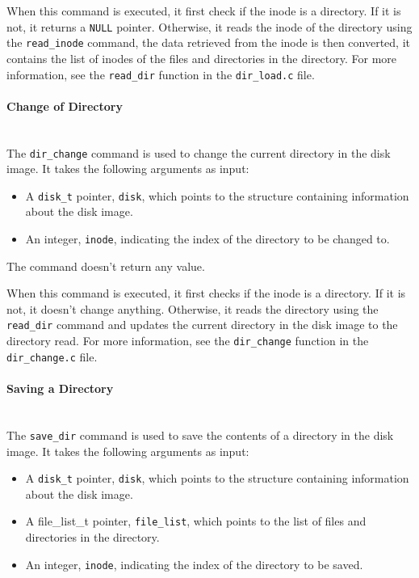 \documentclass{article}
\begin{document}
When this command is executed, it first check if the inode is a directory. If it is not, it returns a \texttt{NULL} pointer. Otherwise, it reads the inode of the directory using the \texttt{read\_inode} command, the data retrieved from the inode is then converted, it contains the list of inodes of the files and directories in the directory. For more information, see the \texttt{read\_dir} function in the \texttt{dir\_load.c} file.

\paragraph{Change of Directory}\mbox{}\\
The \texttt{dir\_change} command is used to change the current directory in the disk image. It takes the following arguments as input:

\begin{itemize}
    \item A \texttt{disk\_t} pointer, \texttt{disk}, which points to the structure containing information about the disk image.
    \item An integer, \texttt{inode}, indicating the index of the directory to be changed to.
\end{itemize}

The command doesn't return any value.

When this command is executed, it first checks if the inode is a directory. If it is not, it doesn't change anything. Otherwise, it reads the directory using the \texttt{read\_dir} command and updates the current directory in the disk image to the directory read. For more information, see the \texttt{dir\_change} function in the \texttt{dir\_change.c} file.

\paragraph{Saving a Directory}\mbox{}\\
The \texttt{save\_dir} command is used to save the contents of a directory in the disk image. It takes the following arguments as input:

\begin{itemize}
    \item A \texttt{disk\_t} pointer, \texttt{disk}, which points to the structure containing information about the disk image.
    \item A file\_list\_t pointer, \texttt{file\_list}, which points to the list of files and directories in the directory.
    \item An integer, \texttt{inode}, indicating the index of the directory to be saved.
\end{itemize}
\end{document}
